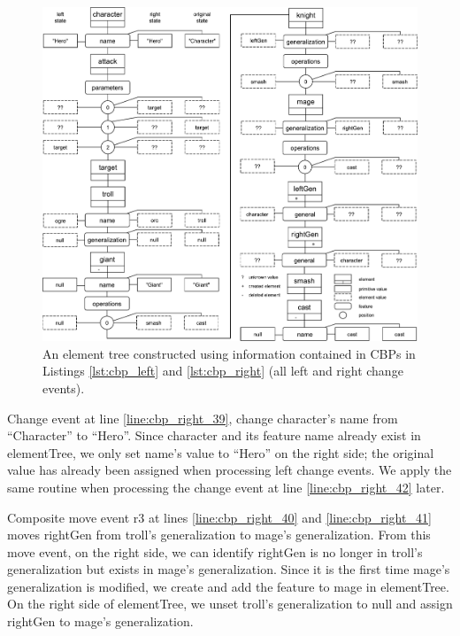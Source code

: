 \begin{figure}[]
  \centering
  \includegraphics[width=\linewidth]{element_tree_game_right}
  \caption{An element tree constructed using information contained in CBPs in Listings \ref{lst:cbp_left} and \ref{lst:cbp_right} (all left and right change events).}
  \label{fig:right_element_tree_diagram}
\end{figure} 

Change event at line \ref{line:cbp_right_39}, change \textsf{character}'s \textsf{name} from ``Character'' to ``Hero''. Since \textsf{character} and its feature \textsf{name} already exist in \textsf{elementTree}, we only set \textsf{name}'s value to ``Hero'' on the right side; the original value has already been assigned when processing left change events. We apply the same routine when processing the change event at line \ref{line:cbp_right_42} later.

Composite move event \textsf{r3} at lines \ref{line:cbp_right_40} and \ref{line:cbp_right_41} moves \textsf{rightGen} from \textsf{troll}'s \textsf{generalization} to \textsf{mage}'s \textsf{generalization}. From this move event, on the right side, we can identify \textsf{rightGen} is no longer in \textsf{troll}'s \textsf{generalization} but exists in \textsf{mage}'s \textsf{generalization}. Since it is the first time \textsf{mage}'s \textsf{generalization} is modified, we create and add the feature to \textsf{mage} in \textsf{elementTree}. On the right side of \textsf{elementTree}, we unset \textsf{troll}'s \textsf{generalization} to null and assign \textsf{rightGen} to \textsf{mage}'s \textsf{generalization}.

